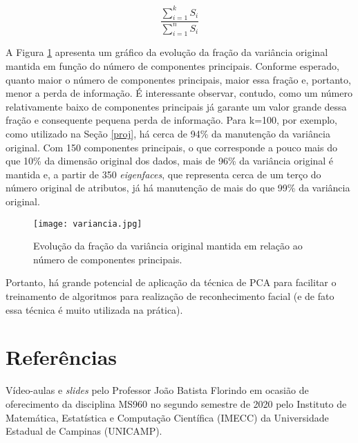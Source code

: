 \documentclass[12pt]{article}
\begin{document}
\begin{equation} \label{var}
\frac{\sum_{i=1}^k S_i}{\sum_{i=1}^n S_i}
\end{equation}

A Figura \ref{variancia} apresenta um gráfico da evolução da fração da variância original mantida em função do número de componentes principais. Conforme esperado, quanto maior o número de componentes principais, maior essa fração e, portanto, menor a perda de informação. É interessante observar, contudo, como um número relativamente baixo de componentes principais já garante um valor grande dessa fração e consequente pequena perda de informação. Para k=100, por exemplo, como utilizado na Seção \ref{proj}, há cerca de 94\% da manutenção da variância original. Com 150 componentes principais, o que corresponde a pouco mais do que 10\% da dimensão original dos dados, mais de 96\% da variância original é mantida e, a partir de 350 \textit{eigenfaces}, que representa cerca de um terço do número original de atributos, já há manutenção de mais do que 99\% da variância original.

\begin{figure} [htp]
\begin{center}
\texttt{[image: variancia.jpg]}
\caption{Evolução da fração da variância original mantida em relação ao número de componentes principais.} \label{variancia}
\end{center}
\end{figure}

Portanto, há grande potencial de aplicação da técnica de PCA para facilitar o treinamento de algoritmos para realização de reconhecimento facial (e de fato essa técnica é muito utilizada na prática).

\section{Referências}
Vídeo-aulas e \textit{slides} pelo Professor João Batista Florindo em ocasião de oferecimento da disciplina MS960 no segundo semestre de 2020 pelo Instituto de Matemática, Estatística e Computação Científica (IMECC) da Universidade Estadual de Campinas (UNICAMP).
\end{document}
